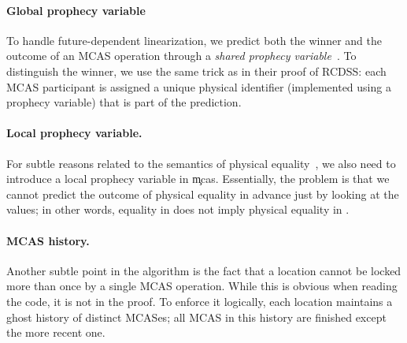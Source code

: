 \paragraph{Global prophecy variable}

To handle future-dependent linearization, we predict both the winner and the outcome of an MCAS operation through a \emph{shared prophecy variable}~\citep{DBLP:journals/pacmpl/JungLPRTDJ20}.
To distinguish the winner, we use the same trick as \citet{DBLP:journals/pacmpl/JungLPRTDJ20} in their proof of RCDSS: each MCAS participant is assigned a unique physical identifier (implemented using a prophecy variable) that is part of the prediction.

\paragraph{Local prophecy variable.}

For subtle reasons related to the semantics of physical equality~\citep{DBLP:journals/pacmpl/AllainS26}, we also need to introduce a local prophecy variable in \c{mcas}.
Essentially, the problem is that we cannot predict the outcome of physical equality in advance just by looking at the values; in other words, equality in \Rocq does not imply physical equality in \OCaml.

\paragraph{MCAS history.}

Another subtle point in the algorithm is the fact that a location cannot be locked more than once by a single MCAS operation.
While this is obvious when reading the code, it is not in the proof.
To enforce it logically, each location maintains a ghost history of distinct MCASes; all MCAS in this history are finished except the more recent one.
